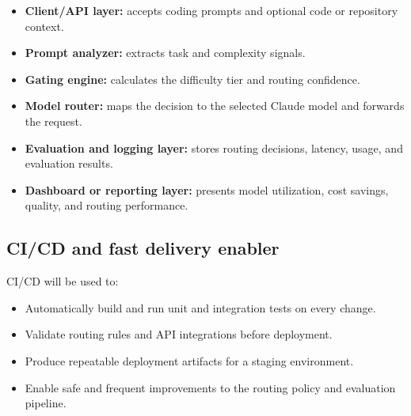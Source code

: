 \documentclass[11pt,a4paper]{article}
\begin{document}
\begin{itemize}[leftmargin=0.7cm]

    \item \textbf{Client/API layer:} accepts coding prompts
    and optional code or repository context.

    \item \textbf{Prompt analyzer:} extracts task and
    complexity signals.

    \item \textbf{Gating engine:} calculates the difficulty
    tier and routing confidence.

    \item \textbf{Model router:} maps the decision to the
    selected Claude model and forwards the request.

    \item \textbf{Evaluation and logging layer:} stores
    routing decisions, latency, usage, and evaluation results.

    \item \textbf{Dashboard or reporting layer:} presents
    model utilization, cost savings, quality, and routing
    performance.

\end{itemize}

\subsection{CI/CD and fast delivery enabler}

CI/CD will be used to:

\begin{itemize}[leftmargin=0.7cm]

    \item Automatically build and run unit and integration
    tests on every change.

    \item Validate routing rules and API integrations before
    deployment.

    \item Produce repeatable deployment artifacts for a
    staging environment.

    \item Enable safe and frequent improvements to the
    routing policy and evaluation pipeline.

\end{itemize}
\end{document}
